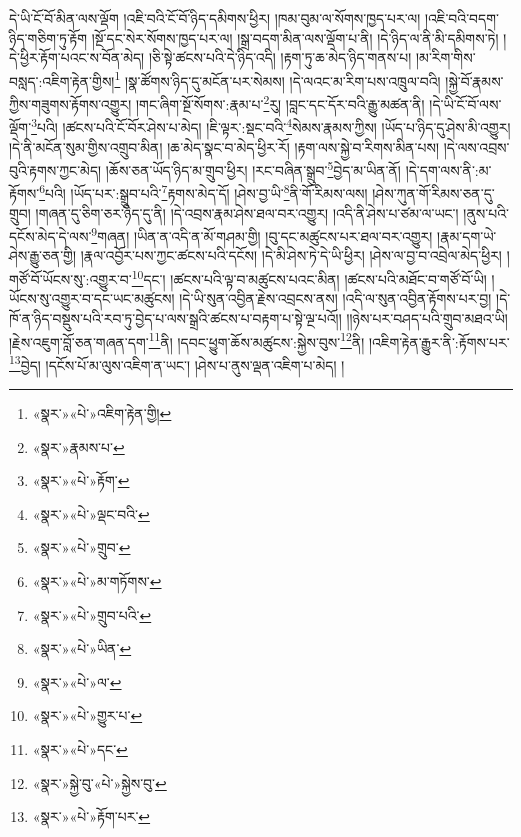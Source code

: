 དེ་ཡི་ངོ་བོ་མིན་ལས་ལྡོག །འཇི་བའི་ངོ་བོ་ཉིད་དམིགས་ཕྱིར། །ཁམ་བུམ་ལ་སོགས་ཁྱད་པར་ལ། །འཇི་བའི་བདག་ཉིད་གཅིག་ཏུ་རྟོག །སྔོ་དང་སེར་སོགས་ཁྱད་པར་ལ། །སྒྲ་བདག་མིན་ལས་ལྡོག་པ་ནི། །དེ་ཉིད་ལ་ནི་མི་དམིགས་ཏེ། །དེ་ཕྱིར་རྟོག་པའང་ས་བོན་མེད། །ཅི་སྟེ་ཚངས་པའི་དེ་ཉིད་འདི། །རྟག་ཏུ་ཆ་མེད་ཉིད་གནས་པ། །མ་རིག་གིས་བསླད་:འཇིག་རྟེན་གྱིས།\footnote{«སྣར་»«པེ་»འཇིག་རྟེན་གྱི།} །སྣ་ཚོགས་ཉིད་དུ་མངོན་པར་སེམས། །དེ་ལའང་མ་རིག་པས་འཁྲུལ་བའི། །སྐྱེ་བོ་རྣམས་ཀྱིས་གཟུགས་རྟོགས་འགྱུར། །གང་ཞིག་སྔོ་སོགས་:རྣམ་པ་\footnote{«སྣར་»རྣམས་པ་}རུ། །བླང་དང་དོར་བའི་རྒྱུ་མཚན་ནི། །དེ་ཡི་ངོ་བོ་ལས་ལྡོག་\footnote{«སྣར་»«པེ་»རྟོག་}པའི། །ཚངས་པའི་ངོ་བོར་ཤེས་པ་མེད། །ཇི་ལྟར་:སྡང་བའི་\footnote{«སྣར་»«པེ་»ལྡང་བའི་}སེམས་རྣམས་ཀྱིས། །ཡོད་པ་ཉིད་དུ་ཤེས་མི་འགྱུར། །དེ་ནི་མངོན་སུམ་གྱིས་འགྲུབ་མིན། །ཆ་མེད་སྣང་བ་མེད་ཕྱིར་རོ། །རྟག་ལས་སྐྱེ་བ་རིགས་མིན་པས། །དེ་ལས་འབྲས་བུའི་རྟགས་ཀྱང་མེད། །ཆོས་ཅན་ཡོད་ཉིད་མ་གྲུབ་ཕྱིར། །རང་བཞིན་སྒྲུབ་\footnote{«སྣར་»«པེ་»གྲུབ་}བྱེད་མ་ཡིན་ནོ། །དེ་དག་ལས་ནི་:མ་རྟོགས་\footnote{«སྣར་»«པེ་»མ་གཏོགས་}པའི། །ཡོད་པར་:སྒྲུབ་པའི་\footnote{«སྣར་»«པེ་»གྲུབ་པའི་}རྟགས་མེད་དོ། །ཤེས་བྱ་ཡི་\footnote{«སྣར་»«པེ་»ཡིན་}ནི་གོ་རིམས་ལས། །ཤེས་ཀུན་གོ་རིམས་ཅན་དུ་གྲུབ། །གཞན་དུ་ཅིག་ཅར་ཉིད་དུ་ནི། །དེ་འབྲས་རྣམ་ཤེས་ཐལ་བར་འགྱུར། །འདི་ནི་ཤེས་པ་ཙམ་ལ་ཡང་། །ནུས་པའི་དངོས་མེད་དེ་ལས་\footnote{«སྣར་»«པེ་»ལ་}གཞན། །ཡིན་ན་འདི་ན་མོ་གཤམ་གྱི། །བུ་དང་མཚུངས་པར་ཐལ་བར་འགྱུར། །རྣམ་དག་ཡེ་ཤེས་རྒྱུ་ཅན་གྱི། །རྣལ་འབྱོར་པས་ཀྱང་ཚངས་པའི་དངོས། །དེ་མི་ཤེས་ཏེ་དེ་ཡི་ཕྱིར། །ཤེས་ལ་བྱ་བ་འབྲེལ་མེད་ཕྱིར། །གཙོ་བོ་ཡོངས་སུ་:འགྱུར་བ་\footnote{«སྣར་»«པེ་»གྱུར་པ་}དང་། །ཚངས་པའི་ལྟ་བ་མཚུངས་པའང་མིན། །ཚངས་པའི་མཐོང་བ་གཙོ་བོ་ཡི། །ཡོངས་སུ་འགྱུར་བ་དང་ཡང་མཚུངས། །དེ་ཡི་སུན་འབྱིན་རྗེས་འབྲངས་ནས། །འདི་ལ་སུན་འབྱིན་རྟོགས་པར་བྱ། །དེ་ཁོ་ན་ཉིད་བསྡུས་པའི་རབ་ཏུ་བྱེད་པ་ལས་སྒྲའི་ཚངས་པ་བརྟག་པ་སྟེ་ལྔ་པའོ།། །།ཉེས་པར་བཤད་པའི་གྲུབ་མཐའ་ཡི། །རྗེས་འཇུག་བློ་ཅན་གཞན་དག་\footnote{«སྣར་»«པེ་»དང་}ནི། །དབང་ཕྱུག་ཆོས་མཚུངས་:སྐྱེས་བུས་\footnote{«སྣར་»སྐྱེ་བུ་«པེ་»སྐྱེས་བུ་}ནི། །འཇིག་རྟེན་རྒྱུར་ནི་:རྟོགས་པར་\footnote{«སྣར་»«པེ་»རྟོག་པར་}བྱེད། །དངོས་པོ་མ་ལུས་འཇིག་ན་ཡང་། །ཤེས་པ་ནུས་ལྡན་འཇིག་པ་མེད། །
